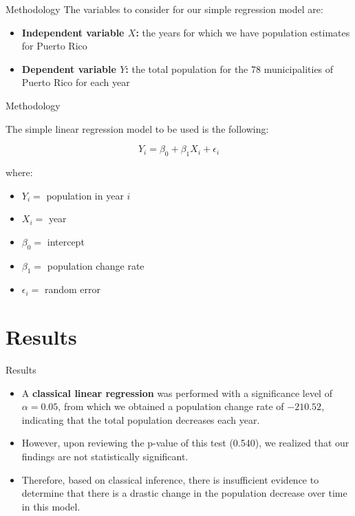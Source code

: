\documentclass[11pt]{beamer}
\begin{document}
\begin{frame}{Methodology}
	The variables to consider for our simple regression model are:
	\begin{itemize}
		\item \textbf{Independent variable $X$:} the years for which we have population estimates for Puerto Rico
		\item \textbf{Dependent variable $Y$:} the total population for the 78 municipalities of Puerto Rico for each year
	\end{itemize}

\end{frame}

\begin{frame}{Methodology}

	The simple linear regression model to be used is the following:

	\[
		Y_i = \beta_0 + \beta_1 X_i + \epsilon_i
	\]

	where:
	\begin{itemize}
		\item $Y_i = $ population in year $i$
		\item $X_i = $ year
		\item $\beta_0 = $ intercept
		\item $\beta_1 = $ population change rate
		\item $\epsilon_i = $ random error
	\end{itemize}


\end{frame}

\section{Results}

\begin{frame}{Results}
	\begin{itemize}
		\item A \textbf{classical linear regression} was performed with a significance level of $\alpha = 0.05$, from which we obtained a population change rate of $-210.52$, indicating that the total population decreases each year.
		\item However, upon reviewing the p-value of this test (0.540), we realized that our findings are not statistically significant.
		\item Therefore, based on classical inference, there is insufficient evidence to determine that there is a drastic change in the population decrease over time in this model.
	\end{itemize}
\end{frame}
\end{document}
